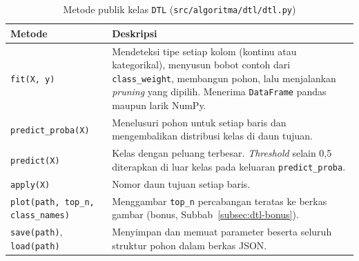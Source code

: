 \begin{table}[H]
	\centering
	\caption{Metode publik kelas \texttt{DTL} (\texttt{src/algoritma/dtl/dtl.py})}
	\label{tab:dtl-fungsi}
	\small
	\begin{tabularx}{\textwidth}{l Y}
		\toprule
		\textbf{Metode} & \textbf{Deskripsi} \\
		\midrule
		\texttt{fit(X, y)} & Mendeteksi tipe setiap kolom (kontinu atau kategorikal), menyusun bobot contoh dari \texttt{class\_weight}, membangun pohon, lalu menjalankan \textit{pruning} yang dipilih. Menerima \texttt{DataFrame} pandas maupun larik NumPy. \\
		\texttt{predict\_proba(X)} & Menelusuri pohon untuk setiap baris dan mengembalikan distribusi kelas di daun tujuan. \\
		\texttt{predict(X)} & Kelas dengan peluang terbesar. \textit{Threshold} selain 0,5 diterapkan di luar kelas pada keluaran \texttt{predict\_proba}. \\
		\texttt{apply(X)} & Nomor daun tujuan setiap baris. \\
		\texttt{plot(path, top\_n, class\_names)} & Menggambar \texttt{top\_n} percabangan teratas ke berkas gambar (bonus, Subbab~\ref{subsec:dtl-bonus}). \\
		\texttt{save(path)}, \texttt{load(path)} & Menyimpan dan memuat parameter beserta seluruh struktur pohon dalam berkas JSON. \\
		\bottomrule
	\end{tabularx}
\end{table}

